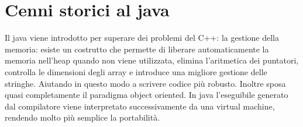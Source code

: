 \section{Cenni storici al java}
Il java viene introdotto per superare dei problemi del C++: la gestione della memoria: esiste un costrutto che permette di liberare automaticamente la memoria nell'heap quando 
non viene utilizzata, elimina l'aritmetica dei puntatori, controlla le dimensioni degli array e introduce una migliore gestione delle stringhe. Aiutando in questo modo a 
scrivere codice pi\`u robusto. Inoltre sposa quasi completamente il paradigma object oriented. In java l'eseguibile generato dal compilatore viene interpretato successivamente
da una virtual machine, rendendo molto pi\`u semplice la portabilit\`a.	